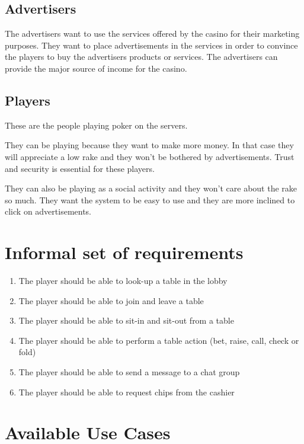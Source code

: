 \documentclass[a4paper,11pt]{report}
\begin{document}
\subsection{Advertisers}
The advertisers want to use the services offered by the casino for their marketing purposes. They 
want to place advertisements in the services in order to convince the players to buy the 
advertisers products or services. The advertisers can provide the major source of income for the casino.

\subsection{Players}
These are the people playing poker on the servers. 

They can be playing because they want to make more money. In that case they will appreciate a low rake and they won't be bothered by advertisements. Trust and security is essential for these players.

They can also be playing as a social activity and they won't care about the rake so much. They want the system to be easy to use and they are more inclined to click on advertisements.

\section{Informal set of requirements}
\begin{enumerate}
\item The player should be able to look-up a table in the lobby
\item The player should be able to join and leave a table
\item The player should be able to sit-in and sit-out from a table
\item The player should be able to perform a table action (bet, raise, call, check or fold)
\item The player should be able to send a message to a chat group
\item The player should be able to request chips from the cashier
\end{enumerate}

\section{Available Use Cases}
\end{document}
